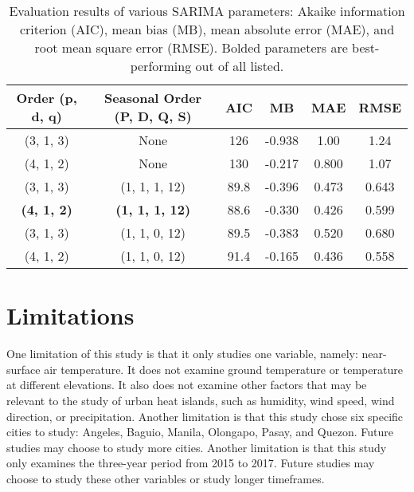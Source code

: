 		\begin{table}[]
			\label{tab:evaluation-sarima-parameters}
			\centering
			\caption{
				Evaluation results of various SARIMA parameters:
				Akaike information criterion (AIC),
				mean bias (MB),
				mean absolute error (MAE),
				and
				root mean square error (RMSE).
				Bolded parameters are best-performing out of all listed.
			}
			\begin{tabular}{ccSSSS}
				\hline \hline
				{Order (p, d, q)} & {Seasonal Order (P, D, Q, S)} & {AIC}  & {MB}     & {MAE}   & {RMSE}  \\
				\hline
				(3, 1, 3)                           & None                                            & 126  & -0.938 & 1.00  & 1.24  \\
				(4, 1, 2)                           & None                                            & 130  & -0.217 & 0.800 & 1.07  \\
				(3, 1, 3)                           & (1, 1, 1, 12)                                   & 89.8 & -0.396 & 0.473 & 0.643 \\
				\textbf{(4, 1, 2)}                  & \textbf{(1, 1, 1, 12)}                          & 88.6 & -0.330 & 0.426 & 0.599 \\
				(3, 1, 3)                           & (1, 1, 0, 12)                                   & 89.5 & -0.383 & 0.520 & 0.680 \\
				(4, 1, 2)                           & (1, 1, 0, 12)                                   & 91.4 & -0.165 & 0.436 & 0.558 \\
				\hline			
			\end{tabular}
		\end{table}

\section{Limitations}
	One limitation of this study is that it only studies one variable, namely: near-surface air temperature.
	It does not examine ground temperature or temperature at different elevations.
	It also does not examine other factors that may be relevant to the study of urban heat islands, such as humidity, wind speed, wind direction, or precipitation. 
	Another limitation is that this study chose six specific cities to study: Angeles, Baguio, Manila, Olongapo, Pasay, and Quezon.
	Future studies may choose to study more cities.
	Another limitation is that this study only examines the three-year period from 2015 to 2017.
	Future studies may choose to study these other variables or study longer timeframes.
	
